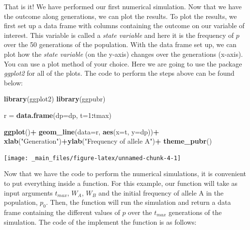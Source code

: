 \documentclass[
]{book}
\newenvironment{Shaded}{\begin{snugshade}}{\end{snugshade}}
\newcommand{\AttributeTok}[1]{\textcolor[rgb]{0.13,0.29,0.53}{#1}}
\newcommand{\DecValTok}[1]{\textcolor[rgb]{0.00,0.00,0.81}{#1}}
\newcommand{\FunctionTok}[1]{\textcolor[rgb]{0.13,0.29,0.53}{\textbf{#1}}}
\newcommand{\NormalTok}[1]{#1}
\newcommand{\OtherTok}[1]{\textcolor[rgb]{0.56,0.35,0.01}{#1}}
\newcommand{\SpecialCharTok}[1]{\textcolor[rgb]{0.81,0.36,0.00}{\textbf{#1}}}
\newcommand{\StringTok}[1]{\textcolor[rgb]{0.31,0.60,0.02}{#1}}
\begin{document}
That is it! We have performed our first numerical simulation. Now that we have the outcome along generations, we can plot the results. To plot the results, we first set up a data frame with columns containing the outcome on our variable of interest. This variable is called a \emph{state variable} and here it is the frequency of \(p\) over the 50 generations of the population. With the data frame set up, we can plot how the \emph{state variable} (on the y-axis) changes over the generations (x-axis). You can use a plot method of your choice. Here we are going to use the package \emph{ggplot2} for all of the plots. The code to perform the steps above can be found below:

\begin{Shaded}
\begin{Highlighting}[]
\FunctionTok{library}\NormalTok{(ggplot2)}
\FunctionTok{library}\NormalTok{(ggpubr)}

\NormalTok{r }\OtherTok{=} \FunctionTok{data.frame}\NormalTok{(}\AttributeTok{dp=}\NormalTok{dp, }\AttributeTok{t=}\DecValTok{1}\SpecialCharTok{:}\NormalTok{tmax)}

\FunctionTok{ggplot}\NormalTok{()}\SpecialCharTok{+}
  \FunctionTok{geom\_line}\NormalTok{(}\AttributeTok{data=}\NormalTok{r, }\FunctionTok{aes}\NormalTok{(}\AttributeTok{x=}\NormalTok{t, }\AttributeTok{y=}\NormalTok{dp))}\SpecialCharTok{+}
  \FunctionTok{xlab}\NormalTok{(}\StringTok{"Generation"}\NormalTok{)}\SpecialCharTok{+}\FunctionTok{ylab}\NormalTok{(}\StringTok{"Frequency of allele A"}\NormalTok{)}\SpecialCharTok{+}
  \FunctionTok{theme\_pubr}\NormalTok{()}
\end{Highlighting}
\end{Shaded}

\texttt{[image: \_main\_files/figure-latex/unnamed-chunk-4-1]}

Now that we have the code to perform the numerical simulations, it is convenient to put everything inside a function. For this example, our function will take as input arguments \(t_{max}\), \(W_{A}\), \(W_{B}\) and the initial frequency of allele A in the population, \(p_{0}\). Then, the function will run the simulation and return a data frame containing the different values of \(p\) over the \(t_{max}\) generations of the simulation. The code of the implement the function is as follows:
\end{document}
